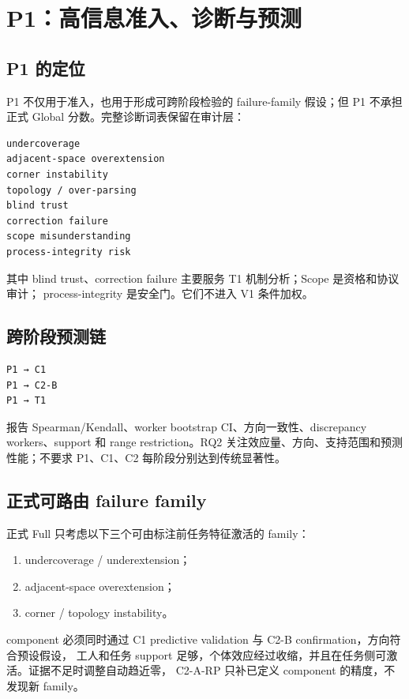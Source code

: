 \section{P1：高信息准入、诊断与预测}

\subsection{P1 的定位}

P1 不仅用于准入，也用于形成可跨阶段检验的 failure-family 假设；但 P1 不承担正式
Global 分数。完整诊断词表保留在审计层：

\begin{verbatim}
undercoverage
adjacent-space overextension
corner instability
topology / over-parsing
blind trust
correction failure
scope misunderstanding
process-integrity risk
\end{verbatim}

其中 blind trust、correction failure 主要服务 T1 机制分析；Scope 是资格和协议审计；
process-integrity 是安全门。它们不进入 V1 条件加权。

\subsection{跨阶段预测链}

\begin{verbatim}
P1 → C1
P1 → C2-B
P1 → T1
\end{verbatim}

报告 Spearman/Kendall、worker bootstrap CI、方向一致性、discrepancy workers、support
和 range restriction。RQ2 关注效应量、方向、支持范围和预测性能；不要求 P1、C1、C2
每阶段分别达到传统显著性。

\subsection{正式可路由 failure family}

正式 Full 只考虑以下三个可由标注前任务特征激活的 family：

\begin{enumerate}
  \item undercoverage / underextension；
  \item adjacent-space overextension；
  \item corner / topology instability。
\end{enumerate}

component 必须同时通过 C1 predictive validation 与 C2-B confirmation，方向符合预设假设，
工人和任务 support 足够，个体效应经过收缩，并且在任务侧可激活。证据不足时调整自动趋近零，
C2-A-RP 只补已定义 component 的精度，不发现新 family。

